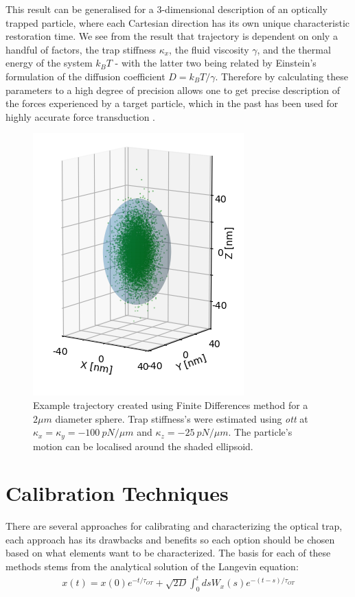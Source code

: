 This result can be generalised for a 3-dimensional description of an 
optically trapped particle, where each Cartesian direction has its 
own unique characteristic restoration time. We see from the result 
that trajectory is dependent on only a handful of factors, the trap 
stiffness $\kappa_x$, the fluid viscosity $\gamma$, and the thermal 
energy of the system $k_BT$ - with the latter two being related by 
Einstein's formulation of the diffusion coefficient $D = k_BT/\gamma$. 
Therefore by calculating these parameters to a high degree of precision 
allows one to get precise description of the forces experienced by a 
target particle, which in the past has been used for highly accurate 
force transduction \cite{BergSoerensen2004, Smith2003}.
\begin{figure}[h!]
	\centering
	\includegraphics[width=0.67\linewidth]{finite_differences.png}
	\caption{Example trajectory created using Finite Differences method
			 for a $2\mu m$ diameter sphere. Trap stiffness's were estimated using \textit{ott} at $\kappa_x = \kappa_y = -100\ pN/\mu m$ and $\kappa_z = -25\ pN/\mu m$. The particle's motion can be localised around the shaded ellipsoid.}
\end{figure}

\section{Calibration Techniques}
\label{sec:calibration_techniques}
There are several approaches for calibrating and characterizing the 
optical trap, each approach has its drawbacks and benefits so each 
option should be chosen based on what elements want to be characterized. 
The basis for each of these methods stems from the analytical solution 
of the Langevin equation:
\begin{align}
	\label{eq:anylitical_lang}
	x(t) = x(0)e^{-t/\tau_{OT}}+\sqrt{2D}\int^t_0dsW_x(s)e^{-(t-s)/\tau_{OT}}
\end{align}

